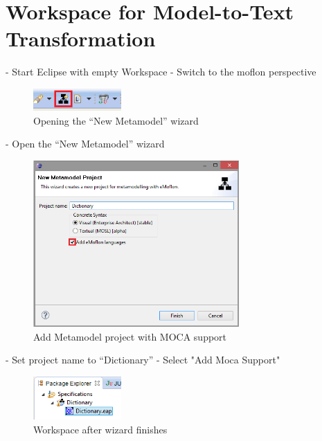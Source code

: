\section{Workspace for Model-to-Text Transformation}

- Start Eclipse with empty Workspace
- Switch to the moflon perspective

\begin{figure}[!htbp]
\begin{center}
 \includegraphics[width=0.3\textwidth]{pics/moca/1DictionaryMetaModel/1-NewMetamodelWizard}
  \caption{Opening the ``New Metamodel'' wizard}
  \label{moca-1-NewMetamodelWizard}
\end{center}
\end{figure}

- Open the ``New Metamodel'' wizard 

\begin{figure}[!htbp]
\begin{center}
 \includegraphics[width=0.7\textwidth]{pics/moca/1DictionaryMetaModel/2-AddMocaSupport-ProjectName}
  \caption{Add Metamodel project with MOCA support}
  \label{moca-2-AddMocaSupport-ProjectName}
\end{center}
\end{figure}

- Set project name to ``Dictionary''
- Select "Add Moca Support" 


\begin{figure}[!htbp]
\begin{center}
 \includegraphics[width=0.3\textwidth]{pics/moca/1DictionaryMetaModel/3-WizardResult}
  \caption{Workspace after wizard finishes}
  \label{moca-3-WizardResult}
\end{center}
\end{figure}

